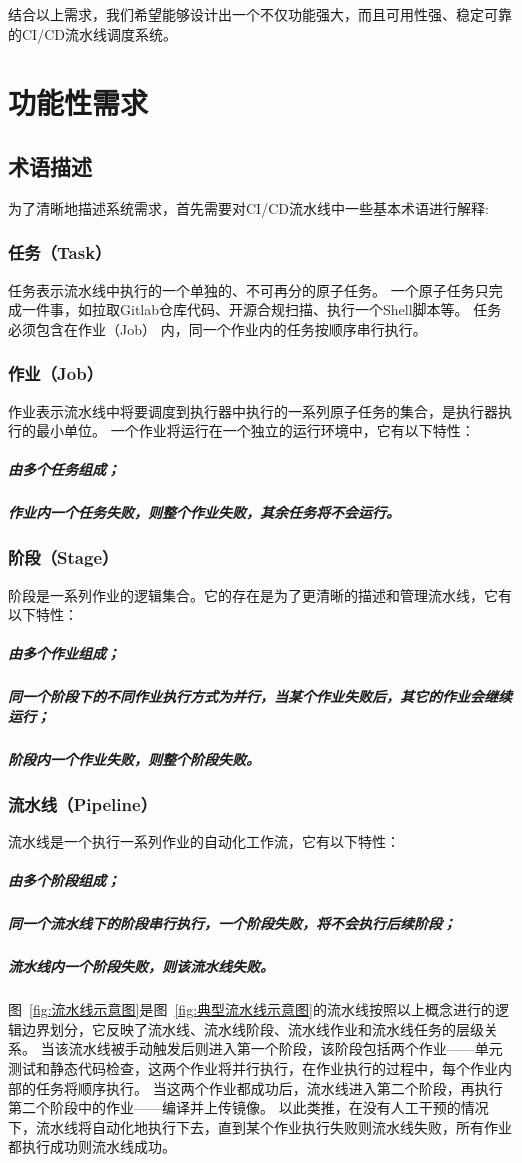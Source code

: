结合以上需求，我们希望能够设计出一个不仅功能强大，而且可用性强、稳定可靠的CI/CD流水线调度系统。

\section{功能性需求}

\subsection{术语描述}
为了清晰地描述系统需求，首先需要对CI/CD流水线中一些基本术语进行解释:

\subsubsection{任务（Task）}
任务表示流水线中执行的一个单独的、不可再分的原子任务。
一个原子任务只完成一件事，如拉取Gitlab仓库代码、开源合规扫描、执行一个Shell脚本等。
任务必须包含在作业（Job） 内，同一个作业内的任务按顺序串行执行。

\subsubsection{作业（Job）}
作业表示流水线中将要调度到执行器中执行的一系列原子任务的集合，是执行器执行的最小单位。
一个作业将运行在一个独立的运行环境中，它有以下特性：
\subparagraph{由多个任务组成；}
\subparagraph{作业内一个任务失败，则整个作业失败，其余任务将不会运行。}

\subsubsection{阶段（Stage）}
阶段是一系列作业的逻辑集合。它的存在是为了更清晰的描述和管理流水线，它有以下特性：
\subparagraph{由多个作业组成；}
\subparagraph{同一个阶段下的不同作业执行方式为并行，当某个作业失败后，其它的作业会继续运行；}
\subparagraph{阶段内一个作业失败，则整个阶段失败。}

\subsubsection{流水线（Pipeline）}
流水线是一个执行一系列作业的自动化工作流，它有以下特性：
\subparagraph{由多个阶段组成；}
\subparagraph{同一个流水线下的阶段串行执行，一个阶段失败，将不会执行后续阶段；}
\subparagraph{流水线内一个阶段失败，则该流水线失败。}

图~\ref{fig:流水线示意图}是图~\ref{fig:典型流水线示意图}的流水线按照以上概念进行的逻辑边界划分，它反映了流水线、流水线阶段、流水线作业和流水线任务的层级关系。
当该流水线被手动触发后则进入第一个阶段，该阶段包括两个作业——单元测试和静态代码检查，这两个作业将并行执行，在作业执行的过程中，每个作业内部的任务将顺序执行。
当这两个作业都成功后，流水线进入第二个阶段，再执行第二个阶段中的作业——编译并上传镜像。
以此类推，在没有人工干预的情况下，流水线将自动化地执行下去，直到某个作业执行失败则流水线失败，所有作业都执行成功则流水线成功。

